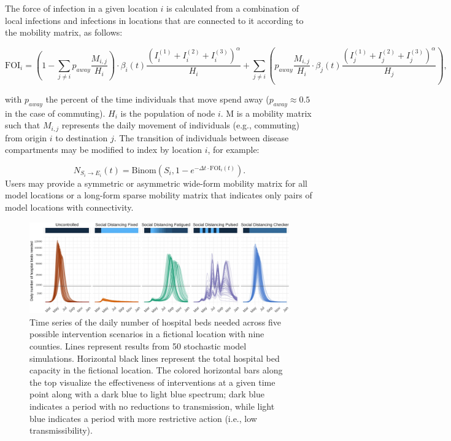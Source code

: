 {The force of infection in a given location $i$ is calculated from a combination of local infections and infections in locations that are connected to it according to the mobility matrix, as follows:
\begin{fullwidth}
\begin{equation}
\text{FOI}_i = \left(1 - \sum_{j\neq i} p_{away} \frac{M_{i,j}}{H_i} \right) \cdot \beta_i(t) \frac{\left(I_i^{(1)} + I_i^{(2)} + I_i^{(3)}\right)^\alpha}{H_i} +  \sum_{j \neq i} \left(p_{away} \frac{M_{i,j}}{H_i} \cdot \beta_j(t) \frac{\left(I_j^{(1)} + I_j^{(2)} + I_j^{(3)}\right)^\alpha}{H_j} \right),
\end{equation}
\end{fullwidth}
with $p_{away}$ the percent of the time individuals that move spend away ($p_{away} \approx 0.5$ in the case of commuting). $H_i$ is the population of node $i$. M is a mobility matrix such that $M_{i,j}$ represents the daily movement of individuals (e.g., commuting) from origin $i$ to destination $j$. The transition of individuals between disease compartments may be modified to index by location $i$, for example:

\begin{equation}
N_{S_i \to E_i} (t) = \text{Binom}\left(S_i ,1 - e^{- \Delta t \cdot\text{FOI}_{i}(t) } \right).
\end{equation}
Users may provide a symmetric or asymmetric wide-form mobility matrix for all model locations or a long-form sparse mobility matrix that indicates only pairs of model locations with connectivity.
\begin{figure}[!htb]%
    \centering
    \includegraphics{fig_pipeline/fig2a}
    \caption[Time series of the daily number of hospital beds needed across scenarios]{Time series of the daily number of hospital beds needed across five possible intervention scenarios in a fictional location with nine counties. Lines represent results from 50 stochastic model simulations. Horizontal black lines represent the total hospital bed capacity in the fictional location. The colored horizontal bars along the top visualize the effectiveness of interventions at a given time point along with a dark blue to light blue spectrum; dark blue indicates a period with no reductions to transmission, while light blue indicates a period with more restrictive action (i.e., low transmissibility).}
    \label{fig:pipeline-seir}
\end{figure}


}
